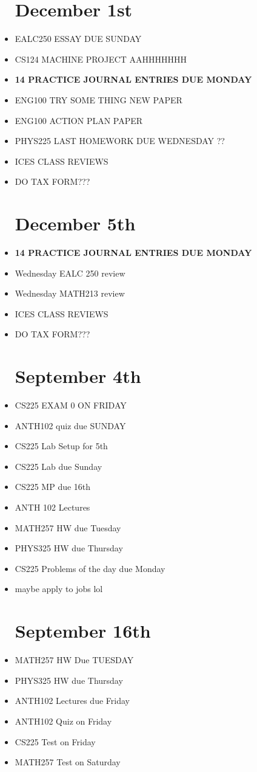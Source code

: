 \documentclass{report}
\newcommand{\done}{\textbf{\checkmark}}
\begin{document}
\begin{itemize}
\chapter{December 1st}
\item
EALC250 ESSAY DUE SUNDAY \done
\item
CS124 MACHINE PROJECT AAHHHHHHH \done
\item
\textbf{ 14 PRACTICE JOURNAL ENTRIES DUE MONDAY }
\item
ENG100 TRY SOME THING NEW PAPER \done
\item
ENG100 ACTION PLAN PAPER \done
\item
PHYS225 LAST HOMEWORK DUE WEDNESDAY \done ??
\item
ICES CLASS REVIEWS
\item
DO TAX FORM???


\chapter{December 5th}
\item
\textbf{ 14 PRACTICE JOURNAL ENTRIES DUE MONDAY } \done
\item
Wednesday EALC 250 review \done
\item
Wednesday MATH213 review \done
\item
ICES CLASS REVIEWS
\item
DO TAX FORM???




\chapter{September 4th}
\item
CS225 EXAM 0 ON FRIDAY 
\item
ANTH102 quiz due SUNDAY
\item
CS225 Lab Setup for 5th \done
\item
CS225 Lab due Sunday \done
\item
CS225 MP due 16th
\item 
ANTH 102 Lectures \done
\item
MATH257 HW due Tuesday \done
\item
PHYS325 HW due Thursday
\item
CS225 Problems of the day due Monday 
\item
maybe apply to jobs lol

\chapter{September 16th}
\item
MATH257 HW Due TUESDAY 
\item
PHYS325 HW due Thursday
\item
ANTH102 Lectures due Friday 
\item 
ANTH102 Quiz on Friday 
\item 
CS225 Test on Friday 
\item 
MATH257 Test on Saturday


\end{itemize}
\end{document}
